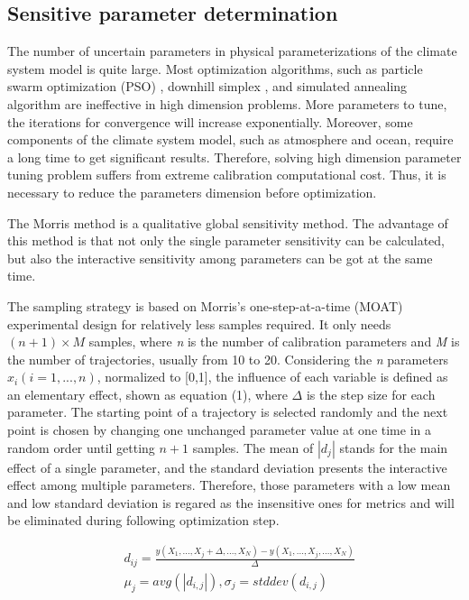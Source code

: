 \documentclass[gmd, manuscript]{copernicus}
\begin{document}
\subsection{Sensitive parameter determination}
The number of uncertain parameters in physical parameterizations of the climate system model is quite large. Most optimization algorithms, such as particle swarm optimization (PSO) \citep{kennedy2010particle}, downhill simplex \citep{press1992numerical,nelder1965simplex}, and simulated annealing algorithm are ineffective in high dimension problems. More parameters to tune, the iterations for convergence will increase exponentially.  Moreover, some components of the climate system model, such as atmosphere and ocean, require a long time to get significant results. Therefore, solving high dimension parameter tuning problem suffers from extreme calibration computational cost.  Thus, it is necessary to reduce the parameters dimension before optimization. 


The Morris method \citep{morris1991factorial, campolongo2007effective} is a qualitative global sensitivity method. The advantage of this method is that not only the single parameter sensitivity can be calculated, but also the interactive sensitivity among parameters can be got at the same time. 

The sampling strategy is based on Morris’s one-step-at-a-time (MOAT) experimental design for relatively less samples required. It only needs $(n+1) \times M$ samples, where \textit{n} is the number of calibration parameters and \textit{M} is the number of trajectories, usually from 10 to 20. Considering the \textit{n} parameters $x_i (i=1,...,n)$, normalized to [0,1], the influence of each variable is defined as an elementary effect, shown as equation (1), where $\Delta$ is the step size for each parameter. The starting point of a trajectory is selected randomly and the next point is chosen by changing one unchanged parameter value at one time in a random order until getting $n+1$ samples. The mean of $|d_j|$ stands for the main effect of a single parameter, and the standard deviation presents the interactive effect among multiple parameters. Therefore, those parameters with a low mean and low standard deviation is regared as the insensitive ones for metrics and will be eliminated during following optimization step. 

\begin{align}
& d_{ij} = \frac{y(X_1,...,X_j+\Delta,...,X_N)-y(X_1,...,X_j,...,X_N)}{\Delta} \\
& \mu_j = avg(|d_{i,j}|), \sigma_j = stddev(d_{i,j}) 
\end{align}
\end{document}
